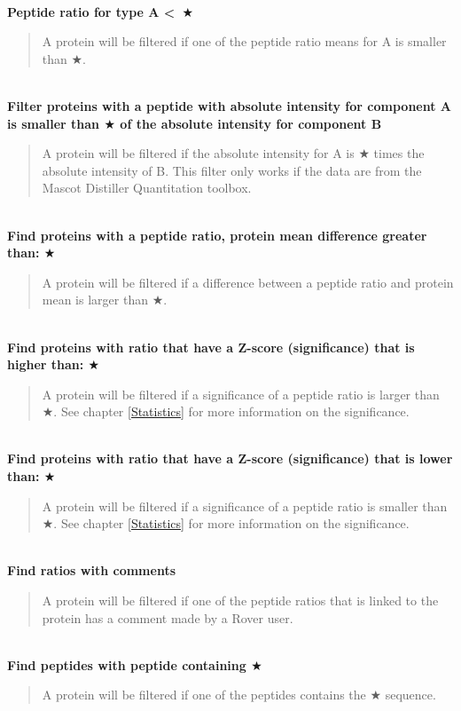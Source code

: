 \documentclass[11pt,a4paper,oneside,notitlepage]{book}
\begin{document}
\\
\textbf{Peptide ratio for type A \textless \ $\bigstar$}
\begin{quotation}A protein will be filtered if one of the peptide ratio means for A is smaller than $\bigstar$.
\end{quotation}
\\
\textbf{Filter proteins with a peptide with absolute intensity for component A \\ is smaller than $\bigstar$ of the absolute intensity for component B}
\begin{quotation}A protein will be filtered if the absolute intensity for A is $\bigstar$ times the absolute intensity of B. This filter only works if the data are from the Mascot Distiller Quantitation toolbox.
\end{quotation}
\\
\textbf{Find proteins with a peptide ratio, protein mean difference greater than: $\bigstar$}
\begin{quotation}A protein will be filtered if a difference between a peptide ratio and protein mean is larger than $\bigstar$.
\end{quotation}
\\
\textbf{Find proteins with ratio that have a Z-score (significance) that is higher than: $\bigstar$}
\begin{quotation}A protein will be filtered if a significance of a peptide ratio is larger than $\bigstar$. See chapter \ref{Statistics} for more information on the significance.
\end{quotation}
\\
\textbf{Find proteins with ratio that have a Z-score (significance) that is lower than: $\bigstar$}
\begin{quotation}A protein will be filtered if a significance of a peptide ratio is smaller than $\bigstar$. See chapter \ref{Statistics} for more information on the significance.
\end{quotation}
\\
\textbf{Find ratios with comments}
\begin{quotation}A protein will be filtered if one of the peptide ratios that is linked to the protein has a comment made by a Rover user.
\end{quotation}
\\
\textbf{Find peptides with peptide containing $\bigstar$}
\begin{quotation}A protein will be filtered if one of the peptides contains the $\bigstar$ sequence.
\end{quotation}
\end{document}
